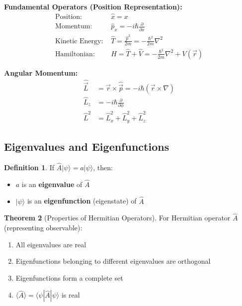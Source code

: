 \documentclass[12pt,a4paper]{article}
\theoremstyle{definition}
\newtheorem{theorem}{Theorem}[section]
\newtheorem{definition}[theorem]{Definition}
\begin{document}
\begin{importantbox}
\textbf{Fundamental Operators (Position Representation):}
\begin{align}
\text{Position: } &\hat{x} = x \\
\text{Momentum: } &\hat{p}_x = -i\hbar\frac{\partial}{\partial x} \\
\text{Kinetic Energy: } &\hat{T} = \frac{\hat{p}^2}{2m} = -\frac{\hbar^2}{2m}\nabla^2 \\
\text{Hamiltonian: } &\hat{H} = \hat{T} + \hat{V} = -\frac{\hbar^2}{2m}\nabla^2 + V(\vec{r})
\end{align}

\textbf{Angular Momentum:}
\begin{align}
\hat{\vec{L}} &= \vec{r} \times \hat{\vec{p}} = -i\hbar(\vec{r} \times \nabla) \\
\hat{L}_z &= -i\hbar\frac{\partial}{\partial\phi} \\
\hat{L}^2 &= \hat{L}_x^2 + \hat{L}_y^2 + \hat{L}_z^2
\end{align}
\end{importantbox}

\subsection{Eigenvalues and Eigenfunctions}

\begin{definition}
If $\hat{A}|\psi\rangle = a|\psi\rangle$, then:
\begin{itemize}
    \item $a$ is an \textbf{eigenvalue} of $\hat{A}$
    \item $|\psi\rangle$ is an \textbf{eigenfunction} (eigenstate) of $\hat{A}$
\end{itemize}
\end{definition}

\begin{theorem}[Properties of Hermitian Operators]
For Hermitian operator $\hat{A}$ (representing observable):
\begin{enumerate}
    \item All eigenvalues are real
    \item Eigenfunctions belonging to different eigenvalues are orthogonal
    \item Eigenfunctions form a complete set
    \item $\langle\hat{A}\rangle = \langle\psi|\hat{A}|\psi\rangle$ is real
\end{enumerate}
\end{theorem}
\end{document}
